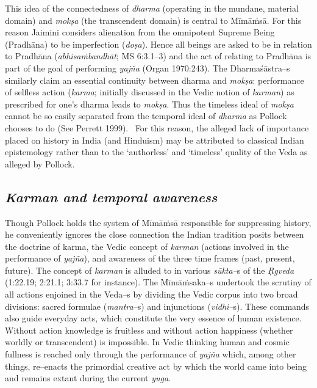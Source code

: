 This idea of the connectedness of \textit{dharma} (operating in the mundane, material domain) and \textit{mokṣa} (the transcendent domain) is central to Mīmāṁsā. For this reason Jaimini considers alienation from the omnipotent Supreme Being (Pradhāna) to be imperfection (\textit{doṣa}). Hence all beings are asked to be in relation to Pradhāna (\textit{abhisaṁbandhāt}; MS 6:3.1–3) and the act of relating to Pradhāna is part of the goal of performing \textit{yajña} (Organ 1970:243). The Dharmaśāstra–s similarly claim an essential continuity between dharma and \textit{mokṣa}: performance of selfless action (\textit{karma}; initially discussed in the Vedic notion of \textit{karman}) as prescribed for one's dharma leads to \textit{mokṣa}. Thus the timeless ideal of \textit{mokṣa} cannot be so easily separated from the temporal ideal of \textit{dharma} as Pollock chooses to do (See Perrett 1999).  For this reason, the alleged lack of importance placed on history in India (and Hinduism) may be attributed to classical Indian epistemology rather than to the ‘authorless’ and ‘timeless’ quality of the Veda as alleged by Pollock.


\subsection*{\textit{Karman and temporal awareness}}

Though Pollock holds the system of Mīmāṁsā responsible for suppressing history, he conveniently ignores the close connection the Indian tradition posits between the doctrine of karma, the Vedic concept of \textit{karman} (actions involved in the performance of \textit{yajña}), and awareness of the three time frames (past, present, future). The concept of \textit{karman} is alluded to in various \textit{sūkta–}s of the \textit{Ṛgveda} (1:22.19; 2:21.1; 3:33.7 for instance). The Mīmāṁsaka–s undertook the scrutiny of all actions enjoined in the Veda–s by dividing the Vedic corpus into two broad divisions: sacred formulae (\textit{mantra}–s) and injunctions (\textit{vidhi–}s). These commands also guide everyday acts, which constitute the very essence of human existence. Without action knowledge is fruitless and without action happiness (whether worldly or transcendent) is impossible. In Vedic thinking human and cosmic fullness is reached only through the performance of \textit{yajña} which, among other things, re–enacts the primordial creative act by which the world came into being and remains extant during the current \textit{yuga}.

